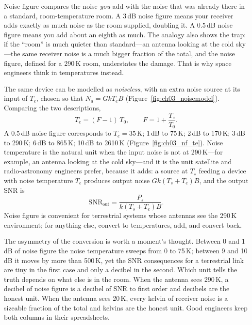 \begin{analogy}
Noise figure compares the noise \emph{you} add with the noise that was already there in a standard,
room-temperature room. A 3\,dB noise figure means your receiver adds exactly as much noise as the room
supplied, doubling it. A 0.5\,dB noise figure means you add about an eighth as much. The analogy also
shows the trap: if the ``room'' is much quieter than standard---an antenna looking at the cold sky---the
same receiver noise is a much bigger fraction of the total, and the noise figure, defined for a
290\,K room, understates the damage. That is why space engineers think in temperatures instead.
\end{analogy}

The same device can be modelled as \emph{noiseless}, with an extra noise source at its input of
 $T_e$, chosen so that $N_a=GkT_eB$ (Figure~\ref{fig:ch03_noisemodel}).
Comparing the two descriptions,
\begin{equation}
T_e=(F-1)\,T_0,\qquad F=1+\frac{T_e}{T_0}.
\label{eq:ch03:te}
\end{equation}
A 0.5\,dB noise figure corresponds to $T_e=35$\,K; 1\,dB to 75\,K; 2\,dB to 170\,K; 3\,dB to 290\,K; 6\,dB
to 865\,K; 10\,dB to 2610\,K (Figure~\ref{fig:ch03_nf_te}). Noise temperature is the natural unit when the
input noise is not at 290\,K---for example, an antenna looking at the cold sky---and it is the unit
satellite and radio-astronomy engineers prefer, because it adds: a source at $T_s$ feeding a device with
noise temperature $T_e$ produces output noise $Gk(T_s+T_e)B$, and the output SNR is
\begin{equation}
\mathrm{SNR}_{\text{out}}=\frac{P_s}{k(T_s+T_e)B}.
\label{eq:ch03:snrtsys}
\end{equation}
Noise figure is convenient for terrestrial systems whose antennas see the 290\,K environment; for
anything else, convert to temperatures, add, and convert back.


The asymmetry of the conversion is worth a moment's thought. Between 0 and 1\,dB of noise figure the
noise temperature sweeps from 0 to 75\,K; between 9 and 10\,dB it moves by more than 500\,K, yet the
SNR consequences for a terrestrial link are tiny in the first case and only a decibel in the second.
Which unit tells the truth depends on what else is in the room. When the antenna sees 290\,K, a
decibel of noise figure is a decibel of SNR to first order and decibels are the honest unit. When the
antenna sees 20\,K, every kelvin of receiver noise is a sizeable fraction of the total and kelvins are
the honest unit. Good engineers keep both columns in their spreadsheets.

